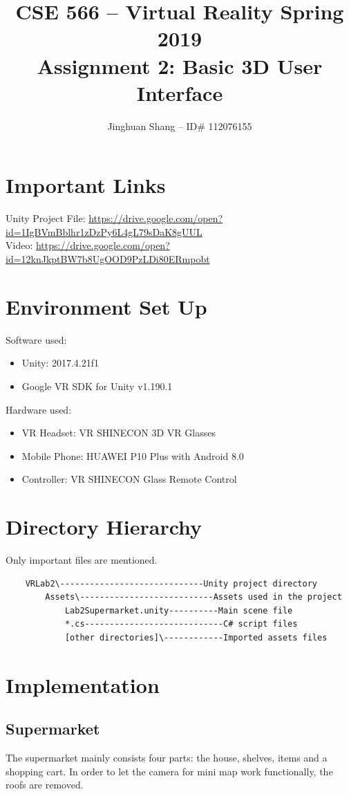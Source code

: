 \documentclass[11pt]{article}
\title{\bf CSE 566 -- 
	Virtual Reality Spring  2019 \\
	Assignment 2: Basic 3D User Interface \\
}
\author{Jinghuan Shang -- ID\# 112076155}
\begin{document}
	\maketitle
	\section{Important Links}
	Unity Project File: \url{https://drive.google.com/open?id=1IgBVmBblhr1zDzPy6L4gL79sDaK8gUUL}\\
	Video: \url{https://drive.google.com/open?id=12knJkptBW7b8UgOOD9PzLDi80ERmpobt}\\
	\section{Environment Set Up}
	Software used:
	\begin{itemize}
		\item Unity: 2017.4.21f1
		\item Google VR SDK for Unity v1.190.1\cite{googlevrsdk}
	\end{itemize}
	Hardware used: 
	\begin{itemize}
		\item VR Headset: VR SHINECON 3D VR Glasses
		\item Mobile Phone: HUAWEI P10 Plus with Android 8.0
		\item Controller: VR SHINECON Glass Remote Control
	\end{itemize}
	
	\section{Directory Hierarchy}
	Only important files are mentioned.
	\begin{lstlisting}
	VRLab2\-----------------------------Unity project directory
		Assets\---------------------------Assets used in the project
			Lab2Supermarket.unity----------Main scene file
			*.cs----------------------------C# script files
			[other directories]\------------Imported assets files\end{lstlisting}
	
	\section{Implementation}
	\subsection{Supermarket}
	The supermarket mainly consists four parts: the house, shelves, items and a shopping cart. In order to let the camera for mini map work functionally, the roofs are removed.
	
\end{document}
